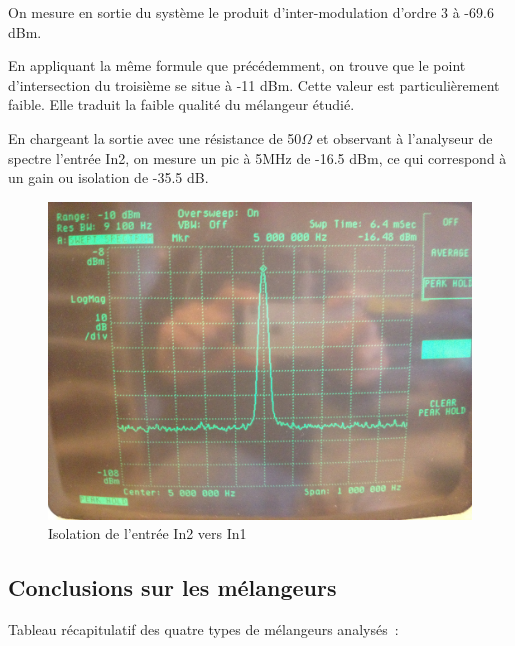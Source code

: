\documentclass{article}
\begin{document}
On mesure en sortie du système le produit d'inter-modulation d'ordre 3 à -69.6 dBm.

En appliquant la même formule que précédemment, on trouve que le point d'intersection du troisième se situe à -11 dBm. Cette valeur est particulièrement faible. Elle traduit la faible qualité du mélangeur étudié.



En chargeant la sortie avec une résistance de 50$\Omega$ et observant à l'analyseur de spectre l'entrée In2, on mesure un pic à 5MHz de -16.5 dBm, ce qui correspond à un gain ou isolation de -35.5 dB.

\begin{figure}[h!]
	\centering
	\includegraphics[width=.7\textwidth]{11_3_5}
	\caption{Isolation de l'entrée In2 vers In1}
	\label{fig:11_3_5}
\end{figure}



\clearpage


\subsection{Conclusions sur les mélangeurs}


Tableau récapitulatif des quatre types de mélangeurs analysés~:
\end{document}
